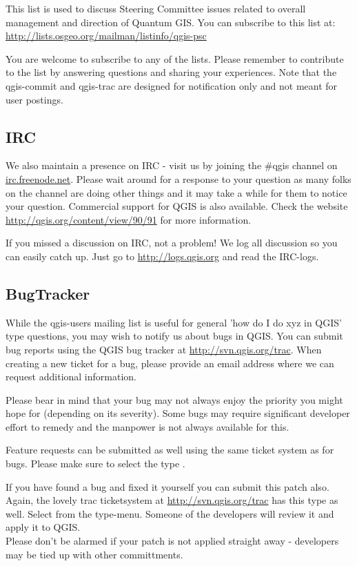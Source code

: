 This list is used to discuss Steering Committee issues related to overall
management and direction of Quantum GIS. You can subscribe to this list at:\\
\url{http://lists.osgeo.org/mailman/listinfo/qgis-psc}

You are welcome to subscribe to any of the lists. Please remember to
contribute to the list by answering questions and sharing your experiences.
Note that the qgis-commit and qgis-trac are designed for notification only
and not meant for user postings. 

\subsection{IRC}
We also maintain a presence on IRC - visit us by joining the \#qgis channel on
\url{irc.freenode.net}. Please wait around for a response to your question as many
folks on the channel are doing other things and it may take a while for them to
notice your question. Commercial support for QGIS is also available.
Check the website \url{http://qgis.org/content/view/90/91} for more information.

If you missed a discussion on IRC, not a problem! We log all discussion so you can 
easily catch up. Just go to \url{http://logs.qgis.org} and read the IRC-logs.

\subsection{BugTracker}
While the qgis-users mailing list is useful for general 'how do I do xyz in
QGIS' type questions, you may wish to notify us about bugs in QGIS. You can
submit bug reports using the QGIS bug tracker at \url{http://svn.qgis.org/trac}. 
When creating a new ticket for a bug, please provide an email
address where we can request additional information.

Please bear in
mind that your bug may not always enjoy the priority you might hope for
(depending on its severity). Some bugs may require significant
developer effort to remedy and the manpower is not always available for this.

Feature requests can be submitted as well using the same ticket system as for bugs.
Please make sure to select the type .

If you have found a bug and fixed it yourself you can submit this patch also.
Again, the lovely trac ticketsystem at \url{http://svn.qgis.org/trac} has this type as well. 
Select  from the type-menu. Someone of the developers will review it and
apply it to QGIS. \\
Please don't be alarmed if your patch is not applied straight away - developers
may be tied up with other committments.

